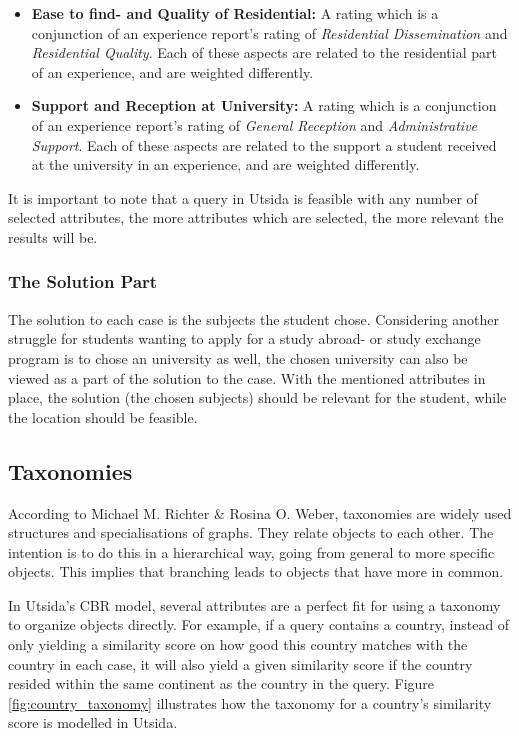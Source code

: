 \begin{itemize}
\item \textbf{Ease to find- and Quality of Residential:} A rating which is a conjunction of an experience report's rating of \emph{Residential Dissemination} and \emph{Residential Quality}. Each of these aspects are related to the residential part of an experience, and are weighted differently.

\item \textbf{Support and Reception at University:} A rating which is a conjunction of an experience report's rating of \emph{General Reception} and \emph{Administrative Support}. Each of these aspects are related to the support a student received at the university in an experience, and are weighted differently.
\end{itemize}

It is important to note that a query in Utsida is feasible with any number of selected attributes, the more attributes which are selected, the more relevant the results will be. 


\subsubsection{The Solution Part}
The solution to each case is the subjects the student chose. Considering another struggle for students wanting to apply for a study abroad- or study exchange program is to chose an university as well, the chosen university can also be viewed as a part of the solution to the case. With the mentioned attributes in place, the solution (the chosen subjects) should be relevant for the student, while the location should be feasible. 

\subsection{Taxonomies}\label{sec:taxonomies}
According to Michael M. Richter \& Rosina O. Weber\cite{richter2013case}, taxonomies are widely used structures and specialisations of graphs. They relate
objects to each other. The intention is to do this in a hierarchical way, going from
general to more specific objects. This implies that branching leads to objects that
have more in common. 

In Utsida's CBR model, several attributes are a perfect fit for using a taxonomy to organize objects directly. For example, if a query contains a country, instead of only yielding a similarity score on how good this country matches with the country in each case, it will also yield a given similarity score if the country resided within the same continent as the country in the query. Figure \ref{fig:country_taxonomy} illustrates how the taxonomy for a country's similarity score is modelled in Utsida.

